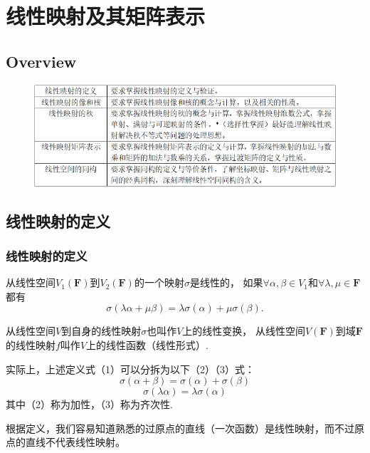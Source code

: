 \chapter{线性映射及其矩阵表示}

\section{Overview}
\begin{figure}[h]
	\centering
	\includegraphics[scale=0.58]{2.png}
\end{figure}

\section{线性映射的定义}
\subsection{线性映射的定义}
\begin{definition}
	从线性空间$V_1(\mathbf{F})$到$V_2(\mathbf{F})$的一个映射$\sigma$是线性的，
	如果$\forall \alpha,\beta \in V_1$和$\forall \lambda,\mu \in \mathbf{F}$都有
	\begin{equation}
		\sigma(\lambda\alpha+\mu\beta)=\lambda\sigma(\alpha)+\mu\sigma(\beta).
	\end{equation}
	
	从线性空间$V$到自身的线性映射$\sigma$也叫作$V$上的线性变换，
	从线性空间$V(\mathbf{F})$到域$\mathbf{F}$的线性映射$f$叫作$V$上的线性函数（线性形式）.
\end{definition}
实际上，上述定义式（1）可以分拆为以下（2）（3）式：
\begin{equation}
	\sigma(\alpha+\beta)=\sigma(\alpha)+\sigma(\beta)
\end{equation}
\begin{equation}
	\sigma(\lambda\alpha)=\lambda\sigma(\alpha)
\end{equation}
其中（2）称为加性，（3）称为齐次性.

根据定义，我们容易知道熟悉的过原点的直线（一次函数）是线性映射，而不过原点的直线不代表线性映射。

